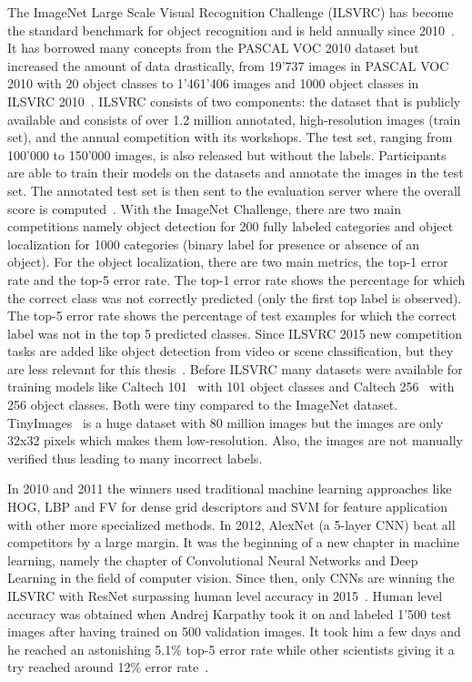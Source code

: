 The ImageNet Large Scale Visual Recognition Challenge (ILSVRC) has become the standard benchmark for object recognition and is held annually since 2010~\cite{imagenet}. It has borrowed many concepts from the PASCAL VOC 2010 dataset but increased the amount of data drastically, from 19'737 images in PASCAL VOC 2010 with 20 object classes to 1'461'406 images and 1000 object classes in ILSVRC 2010~\cite{everingham2010pascal, russakovsky2015imagenet}. ILSVRC consists of two components: the dataset that is publicly available and consists of over 1.2 million annotated, high-resolution images (train set), and the annual competition with its workshops. The test set, ranging from 100'000 to 150'000 images, is also released but without the labels. Participants are able to train their models on the datasets and annotate the images in the test set. The annotated test set is then sent to the evaluation server where the overall score is computed~\cite{russakovsky2015imagenet}. With the ImageNet Challenge, there are two main competitions namely object detection for 200 fully labeled categories and object localization for 1000 categories (binary label for presence or absence of an object). For the object localization, there are two main metrics, the top-1 error rate and the top-5 error rate. The top-1 error rate shows the percentage for which the correct class was not correctly predicted (only the first top label is observed). The top-5 error rate shows the percentage of test examples for which the correct label was not in the top 5 predicted classes. Since ILSVRC 2015 new competition tasks are added like object detection from video or scene classification, but they are less relevant for this thesis~\cite{imagenet2015}. Before ILSVRC many datasets were available for training models like Caltech 101~\cite{fei2007learning} with 101 object classes and Caltech 256~\cite{griffin2007caltech} with 256 object classes. Both were tiny compared to the ImageNet dataset. TinyImages~\cite{torralba200880} is a huge dataset with 80 million images but the images are only 32x32 pixels which makes them low-resolution. Also, the images are not manually verified thus leading to many incorrect labels.

In 2010 and 2011 the winners used traditional machine learning approaches like HOG, LBP and FV for dense grid descriptors and SVM for feature application with other more specialized methods. In 2012, AlexNet (a 5-layer CNN) beat all competitors by a large margin. It was the beginning of a new chapter in machine learning, namely the chapter of Convolutional Neural Networks and Deep Learning in the field of computer vision. Since then, only CNNs are winning the ILSVRC with ResNet surpassing human level accuracy in 2015~\cite{he2016deep}. Human level accuracy was obtained when Andrej Karpathy took it on and labeled 1'500 test images after having trained on 500 validation images. It took him a few days and he reached an astonishing 5.1\% top-5 error rate while other scientists giving it a try reached around 12\% error rate~\cite{humanlevel2014}.


